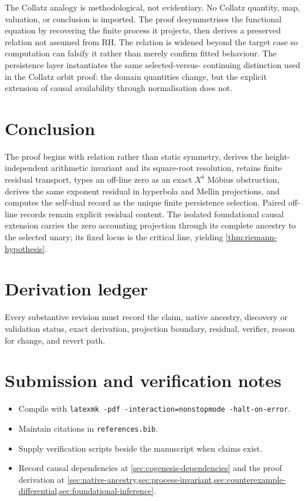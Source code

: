 \documentclass[11pt,a4paper]{article}
\theoremstyle{definition}
\begin{document}
The Collatz analogy is methodological, not evidentiary. No Collatz quantity,
map, valuation, or conclusion is imported. The proof desymmetrises the
functional equation by recovering the finite process it projects, then derives
a preserved relation not assumed from RH. The relation is widened beyond the
target case so computation can falsify it rather than merely confirm fitted
behaviour. The persistence layer instantiates the same selected-versus-
continuing distinction used in the Collatz orbit proof: the domain quantities
change, but the explicit extension of causal availability through
normalisation does not.

\section{Conclusion}
\label{sec:conclusion}

The proof begins with relation rather than static symmetry, derives the
height-independent arithmetic invariant and its square-root resolution,
retains finite residual transport, types an off-line zero as an exact
$X^\delta$ Möbius obstruction, derives the same exponent residual in hyperbola
and Mellin projections, and computes the self-dual record as the unique finite
persistence selection. Paired off-line records remain explicit residual
content. The isolated foundational causal extension carries the zero accounting
projection through its complete ancestry to the selected unary; its fixed
locus is the critical line, yielding \cref{thm:riemann-hypothesis}.

\appendix
\section{Derivation ledger}
\label{app:derivation-ledger}

Every substantive revision must record the claim, native ancestry, discovery
or validation status, exact derivation, projection boundary, residual,
verifier, reason for change, and revert path.

\section{Submission and verification notes}
\label{app:submission}

\begin{itemize}
  \item Compile with
        \texttt{latexmk -pdf -interaction=nonstopmode -halt-on-error}.
  \item Maintain citations in \texttt{references.bib}.
  \item Supply verification scripts beside the manuscript when claims exist.
  \item Record causal dependencies at
        \cref{sec:cogenesis-dependencies} and the proof derivation at
        \cref{sec:native-ancestry,sec:process-invariant,sec:counterexample-differential,sec:foundational-inference}.
\end{itemize}

\printbibliography[title={References}]
\end{document}
